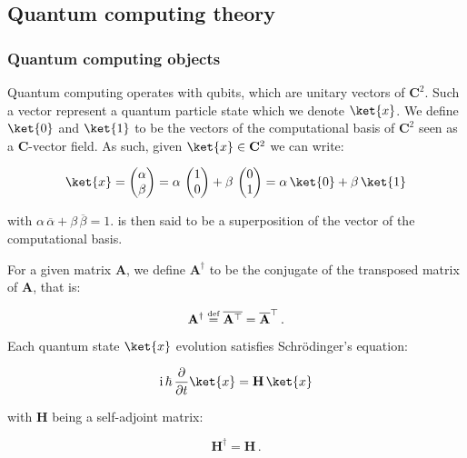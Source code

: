 \documentclass[11pt, a4paper]{article}
\begin{document}
        \subsection{Quantum computing theory}
            \subsubsection{Quantum computing objects}
                Quantum computing operates with qubits, which are unitary vectors of \(\mathbf{C}^2\). Such a vector represent a quantum particle state which we denote \(\ket{x}\). We define \(\ket{0}\) and \(\ket{1}\) to be the vectors of the computational basis of \(\mathbf{C}^2\) seen as a \(\mathbf{C}\)-vector field. As such, given \(\ket{x}\in\mathbf{C}^2\) we can write:
                
                \[\ket{x} = \begin{pmatrix}\alpha\\\beta\end{pmatrix}=\alpha\,\begin{pmatrix}1\\0\end{pmatrix} + \beta\,\begin{pmatrix}0\\1\end{pmatrix}=\alpha\,\ket{0} + \beta\,\ket{1}\]
                
                with \(\alpha\,\overline{\alpha} + \beta\,\overline{\beta} = 1\).  is then said to be a superposition of the vector of the computational basis.
                
                For a given matrix \(\mathbf{A}\), we define \(\mathbf{A}^\dagger\) to be the conjugate of the transposed matrix of \(\mathbf{A}\), that is:
                
                \[\mathbf{A}^\dagger \overset{\text{\tiny{def}}}{=} \overline{\mathbf{A}^\top} = \overline{\mathbf{A}}^\top\,.\]
                
                Each quantum state \(\ket{x}\) evolution satisfies Schrödinger's equation:
                
                \[\mathrm{i}\,\hbar\,\frac{\partial}{\partial t}\ket{x} = \mathbf{H}\,\ket{x}\]
                
                with \(\mathbf{H}\) being a self-adjoint matrix:
                
                \[\mathbf{H}^\dagger=\mathbf{H}\,.\]
                
\end{document}
